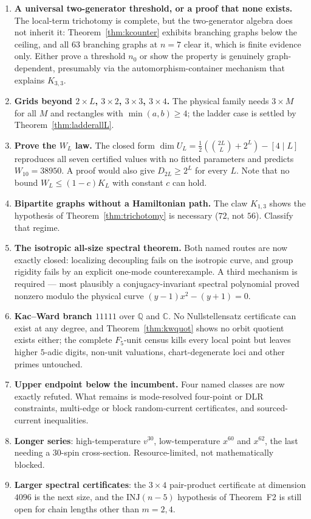 \documentclass[11pt]{article}
\theoremstyle{definition}
\newcommand{\Qb}{\mathbb{Q}}
\newcommand{\Cb}{\mathbb{C}}
\begin{document}
\begin{enumerate}[leftmargin=*,itemsep=2pt]
\item \textbf{A universal two-generator threshold, or a proof that none exists.} The local-term
      trichotomy is complete, but the two-generator algebra does not inherit it:
      Theorem~\ref{thm:kcounter} exhibits branching graphs below the ceiling, and all $63$ branching
      graphs at $n=7$ clear it, which is finite evidence only. Either prove a threshold $n_0$ or show
      the property is genuinely graph-dependent, presumably via the automorphism-container mechanism
      that explains $K_{3,3}$.
\item \textbf{Grids beyond $2\times L$, $3\times2$, $3\times3$, $3\times4$.} The physical family
      needs $3\times M$ for all $M$ and rectangles with $\min(a,b)\ge4$; the ladder case is settled by
      Theorem~\ref{thm:ladderallL}.
\item \textbf{Prove the $W_L$ law.} The closed form
      $\dim U_L=\frac12(\binom{2L}{L}+2^L)-[4\mid L]$ reproduces all seven certified values with no
      fitted parameters and predicts $W_{10}=38950$. A proof would also give $D_{2L}\ge2^L$ for every
      $L$. Note that no bound $W_L\le(1-c)K_L$ with constant $c$ can hold.
\item \textbf{Bipartite graphs without a Hamiltonian path.} The claw $K_{1,3}$ shows the hypothesis
      of Theorem~\ref{thm:trichotomy} is necessary ($72$, not $56$). Classify that regime.
\item \textbf{The isotropic all-size spectral theorem.} Both named routes are now exactly closed:
      localizing decoupling fails on the isotropic curve, and group rigidity fails by an explicit
      one-mode counterexample. A third mechanism is required --- most plausibly a conjugacy-invariant
      spectral polynomial proved nonzero modulo the physical curve $(y-1)x^2-(y+1)=0$.
\item \textbf{Kac--Ward branch $11111$} over $\Qb$ and $\Cb$. No Nullstellensatz certificate can
      exist at any degree, and Theorem~\ref{thm:kwquot} shows no orbit quotient exists either; the
      complete $F_5$-unit census kills every local point but leaves higher $5$-adic digits, non-unit
      valuations, chart-degenerate loci and other primes untouched.
\item \textbf{Upper endpoint below the incumbent.} Four named classes are now exactly refuted. What
      remains is mode-resolved four-point or DLR constraints, multi-edge or block random-current
      certificates, and sourced-current inequalities.
\item \textbf{Longer series}: high-temperature $v^{30}$, low-temperature $x^{60}$ and $x^{62}$, the
      last needing a $30$-spin cross-section. Resource-limited, not mathematically blocked.
\item \textbf{Larger spectral certificates}: the $3\times4$ pair-product certificate at dimension
      $4096$ is the next size, and the $\mathrm{INJ}(n-5)$ hypothesis of Theorem~F2 is still open for
      chain lengths other than $m=2,4$.
\end{enumerate}
\end{document}
